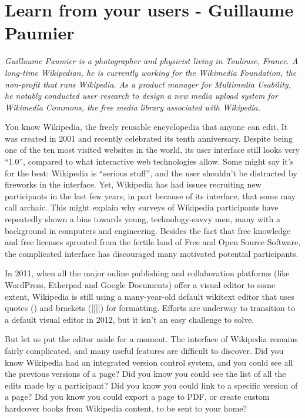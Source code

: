 \chapter{Learn from your users - Guillaume Paumier}

\textit{Guillaume Paumier is a photographer and physicist living in Toulouse, France. A long-time Wikipedian, he is currently working for the Wikimedia Foundation, the non-profit that runs Wikipedia. As a product manager for Multimedia Usability, he notably conducted user research to design a new media upload system for Wikimedia Commons, the free media library associated with Wikipedia.}

You know Wikipedia, the freely reusable encyclopedia that anyone can edit. It was created in 2001 and recently celebrated its tenth anniversary. Despite being one of the ten most visited websites in the world, its user interface still looks very ``1.0'', compared to what interactive web technologies allow. Some might say it's for the best: Wikipedia is ``serious stuff'', and the user shouldn't be distracted by fireworks in the interface. Yet, Wikipedia has had issues recruiting new participants in the last few years, in part because of its interface, that some may call archaic. This might explain why surveys of Wikipedia participants have repeatedly shown a bias towards young, technology-savvy men, many with a background in computers and engineering. Besides the fact that free knowledge and free licenses sprouted from the fertile land of Free and Open Source Software, the complicated interface has discouraged many motivated potential participants.

In 2011, when all the major online publishing and collaboration platforms (like WordPress, Etherpad and Google Documents) offer a visual editor to some extent, Wikipedia is still using a many-year-old default wikitext editor that uses quotes (\textquotesingle \textquotesingle \textquotesingle \textquotesingle) and brackets ([[]]) for formatting. Efforts are underway to transition to a default visual editor in 2012, but it isn't an easy challenge to solve.

But let us put the editor aside for a moment. The interface of Wikipedia remains fairly complicated, and many useful features are difficult to discover. Did you know Wikipedia had an integrated version control system, and you could see all the previous versions of a page? Did you know you could see the list of all the edits made by a participant? Did you know you could link to a specific version of a page? Did you know you could export a page to PDF, or create custom hardcover books from Wikipedia content, to be sent to your home?

